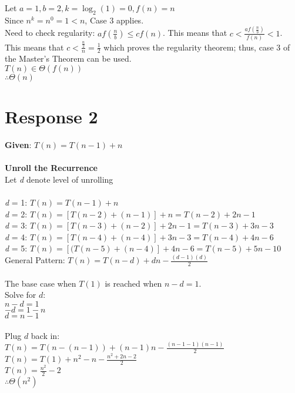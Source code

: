 \documentclass[12pt, a4paper]{article}
\begin{document}
    Let \(a = 1, b = 2, k = \log_{2}(1) = 0, f(n) = n\)\\
    Since \(n^{k} = n^{0} = 1 < n\), Case 3 applies.\\ 
    Need to check regularity: \(af(\frac{n}{b}) \leq cf(n)\). 
    This means that \(c < \frac{af(\frac{n}{b})}{f(n)} < 1\).
    This means that \(c < \frac{\frac{n}{2}}{n} = \frac{1}{2} \) which proves the regularity theorem; thus, case 3 of the Master's Theorem can be used.\\
    \(T(n) \in \Theta(f(n))\)\\
    \(\therefore \Theta(n)\) 
    \newpage
    
\section*{\centering Response 2}
    \textbf{Given}: \(T(n) = T(n-1) + n\)\\
    \\
    \textbf{Unroll the Recurrence}\\
    Let \textit{d} denote level of unrolling\\
    \\
    \textit{d} = 1: \(T(n) = T(n-1) + n\)\\
    \textit{d} = 2: \(T(n) = [T(n-2) + (n-1)] + n = T(n-2) + 2n - 1\)\\
    \textit{d} = 3: \(T(n) = [T(n-3) + (n-2)] + 2n - 1 = T(n-3) + 3n - 3\)\\
    \textit{d} = 4: \(T(n) = [T(n-4) + (n-4)] + 3n - 3 = T(n-4) + 4n - 6\)\\
    \textit{d} = 5: \(T(n) = [(T(n-5)+(n-4)]+4n-6 = T(n-5) + 5n-10\)
    \\
    General Pattern: \(T(n) = T(n - d) + dn - \frac{(d-1)(d)}{2}\)\\
    \\
    The base case when \(T(1)\) is reached when \(n-d = 1\).\\
    Solve for \(d\): \\
    \(n - d = 1\)\\
    \(-d = 1-n\)\\
    \(d=n-1\) \\
    \\
    Plug \(d\) back in:\\
    \(T(n) = T(n - (n-1))+(n-1)n-\frac{(n-1-1)(n-1)}{2}\)\\
    \(T(n) = T(1) + n^2-n-\frac{n^2+2n-2}{2}\)\\
    \(T(n)=\frac{n^2}{2}-2\)\\
    \(\therefore \Theta{(n^2)}\)
    \newpage
\end{document}

